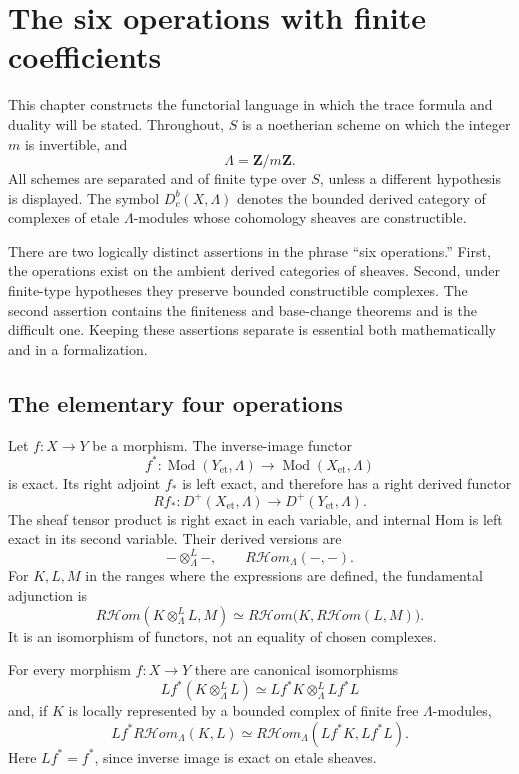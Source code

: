 \chapter{The six operations with finite coefficients}
\label{ch:six-operations}

This chapter constructs the functorial language in which the trace formula and
duality will be stated.  Throughout, \(S\) is a noetherian scheme on which the
integer \(m\) is invertible, and
\[
  \Lambda=\mathbf Z/m\mathbf Z.
\]
All schemes are separated and of finite type over \(S\), unless a different
hypothesis is displayed.  The symbol
\(D^b_c(X,\Lambda)\) denotes the bounded derived category of complexes of
etale \(\Lambda\)-modules whose cohomology sheaves are constructible.

There are two logically distinct assertions in the phrase ``six operations.''
First, the operations exist on the ambient derived categories of sheaves.
Second, under finite-type hypotheses they preserve bounded constructible
complexes.  The second assertion contains the finiteness and base-change
theorems and is the difficult one.  Keeping these assertions separate is
essential both mathematically and in a formalization.

\section{The elementary four operations}

Let \(f:X\to Y\) be a morphism.  The inverse-image functor
\[
  f^*:\operatorname{Mod}(Y_{\mathrm{et}},\Lambda)
       \longrightarrow
       \operatorname{Mod}(X_{\mathrm{et}},\Lambda)
\]
is exact.  Its right adjoint \(f_*\) is left exact, and therefore has a right
derived functor
\[
  Rf_*:D^+(X_{\mathrm{et}},\Lambda)
       \longrightarrow D^+(Y_{\mathrm{et}},\Lambda).
\]
The sheaf tensor product is right exact in each variable, and internal Hom is
left exact in its second variable.  Their derived versions are
\[
  -\otimes_\Lambda^L-,
  \qquad
  R\mathcal Hom_\Lambda(-,-).
\]
For \(K,L,M\) in the ranges where the expressions are defined, the fundamental
adjunction is
\[
  R\mathcal Hom(K\otimes_\Lambda^L L,M)
  \simeq
  R\mathcal Hom\bigl(K,R\mathcal Hom(L,M)\bigr).
\]
It is an isomorphism of functors, not an equality of chosen complexes.

\begin{proposition}
\label{prop:tensor-hom-pullback}
For every morphism \(f:X\to Y\) there are canonical isomorphisms
\[
  Lf^*(K\otimes_\Lambda^L L)
   \simeq Lf^*K\otimes_\Lambda^L Lf^*L
\]
and, if \(K\) is locally represented by a bounded complex of finite free
\(\Lambda\)-modules,
\[
  Lf^*R\mathcal Hom_\Lambda(K,L)
   \simeq
  R\mathcal Hom_\Lambda(Lf^*K,Lf^*L).
\]
Here \(Lf^*=f^*\), since inverse image is exact on etale sheaves.
\end{proposition}

